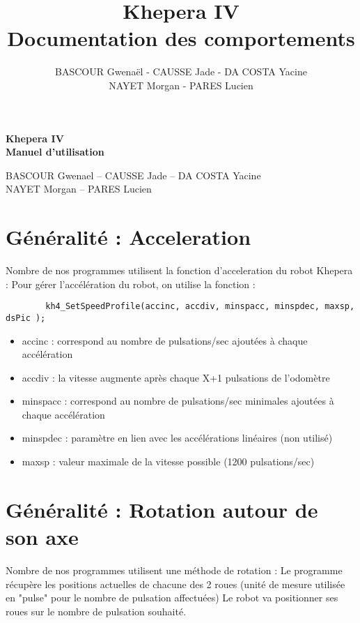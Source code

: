\documentclass[11pt]{article} %
\title{\huge\bfseries Khepera IV \\ Documentation des comportements}
\author{BASCOUR Gwenaël - CAUSSE Jade - DA COSTA Yacine \\ NAYET Morgan - PARES Lucien}
\date{} %
\begin{document}
\begin{titlepage}
	\centering
	\vspace*{\fill}
	
	\vspace*{0.5cm}
	
	\huge\bfseries
	Khepera IV \\ Manuel d'utilisation
	
	\vspace*{0.5cm}
	
	\large BASCOUR Gwenael -- CAUSSE Jade -- DA COSTA Yacine \\ NAYET Morgan -- PARES Lucien
	
	\vspace*{\fill}
\end{titlepage}
\pagebreak
\tableofcontents
\pagebreak
	\section{Généralité : Acceleration}
		Nombre de nos programmes utilisent la fonction d'acceleration du robot Khepera :
		Pour gérer l'accélération du robot, on utilise la fonction :
		\begin{verbatim}
		kh4_SetSpeedProfile(accinc, accdiv, minspacc, minspdec, maxsp, dsPic );
		\end{verbatim}

		\begin{itemize}
			\item{accinc :} correspond au nombre de pulsations/sec ajoutées à chaque accélération
			\item{accdiv :} la vitesse augmente après chaque X+1 pulsations de l'odomètre
			\item{minspacc :} correspond au nombre de pulsations/sec minimales ajoutées à chaque accélération
			\item{minspdec :} paramètre en lien avec les accélérations linéaires (non utilisé)
			\item{maxsp :} valeur maximale de la vitesse possible (1200 pulsations/sec)
		\end{itemize}
	\section{Généralité : Rotation autour de son axe}
		Nombre de nos programmes utilisent une méthode de rotation : 
		Le programme récupère les positions actuelles de chacune des 2 roues (unité de mesure utilisée en "pulse" pour le nombre de pulsation affectuées) Le robot va positionner ses roues sur le nombre de pulsation souhaité. \\ 
\end{document}
